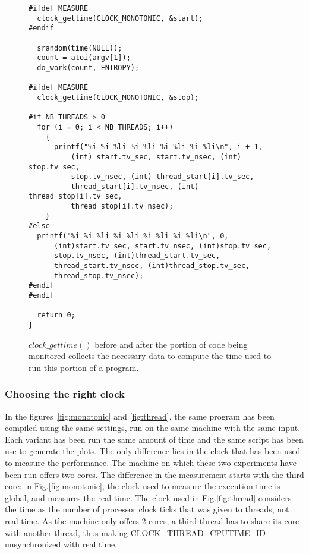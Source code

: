 \begin{figure}
\centering
\begin{lstlisting}
#ifdef MEASURE
  clock_gettime(CLOCK_MONOTONIC, &start);
#endif

  srandom(time(NULL));
  count = atoi(argv[1]);
  do_work(count, ENTROPY);

#ifdef MEASURE
  clock_gettime(CLOCK_MONOTONIC, &stop);

#if NB_THREADS > 0
  for (i = 0; i < NB_THREADS; i++)
    {
      printf("%i %i %li %i %li %i %li %i %li\n", i + 1,
          (int) start.tv_sec, start.tv_nsec, (int) stop.tv_sec,
          stop.tv_nsec, (int) thread_start[i].tv_sec,
          thread_start[i].tv_nsec, (int) thread_stop[i].tv_sec,
          thread_stop[i].tv_nsec);
    }
#else
  printf("%i %i %li %i %li %i %li %i %li\n", 0,
      (int)start.tv_sec, start.tv_nsec, (int)stop.tv_sec,
      stop.tv_nsec, (int)thread_start.tv_sec,
      thread_start.tv_nsec, (int)thread_stop.tv_sec,
      thread_stop.tv_nsec);
#endif
#endif

  return 0;
}
\end{lstlisting}
\caption{$clock\_gettime()$ before and after the portion of code being monitored collects the necessary data to compute the time used to run this portion of a program.}
\label{fig:instrumentation}
\end{figure}

\subsubsection{Choosing the right clock}
\label{app:clock}

In the figures~\ref{fig:monotonic} and \ref{fig:thread}, the same program has been compiled using the same settings, run on the same machine with the same input. Each variant has been run the same amount of time and the same script has been use to generate the plots. The only difference lies in the clock that has been used to measure the performance. The machine on which these two experiments have been run offers two cores. The difference in the measurement starts with the third core: in Fig.\ref{fig:monotonic}, the clock used to measure the execution time is global, and measures the real time. The clock used in Fig.\ref{fig:thread} considers the time as the number of processor clock ticks that was given to threads, not real time. As the machine only offers 2 cores, a third thread has to share its core with another thread, thus making CLOCK\_THREAD\_CPUTIME\_ID unsynchronized with real time.

